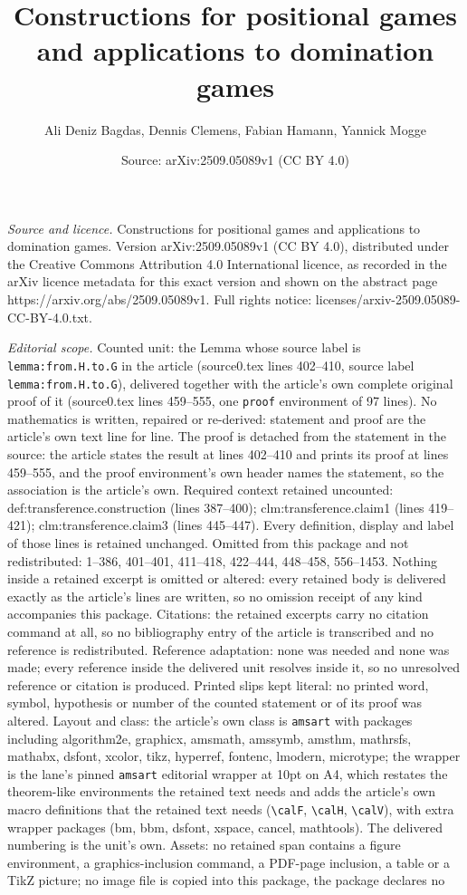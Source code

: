 \documentclass[10pt,a4paper]{amsart}
\title[Constructions for positional games and applications to domin]{Constructions for positional games and applications to domination games}
\author{Ali Deniz Bagdas, Dennis Clemens, Fabian Hamann, Yannick Mogge}
\date{Source: arXiv:2509.05089v1 (CC BY 4.0)}
\begin{document}
\maketitle

\noindent\emph{Source and licence.} Constructions for positional games and applications to domination games. Version arXiv:2509.05089v1 (CC BY 4.0), distributed under the Creative Commons Attribution 4.0 International licence, as recorded in the arXiv licence metadata for this exact version and shown on the abstract page https://arxiv.org/abs/2509.05089v1. Full rights notice: licenses/arxiv-2509.05089-CC-BY-4.0.txt.\par\smallskip

\noindent\textit{Editorial scope.} Counted unit: the Lemma whose source label is \texttt{lemma:from.H.to.G} in the article (source0.tex lines 402--410, source label \texttt{lemma:from.H.to.G}), delivered together with the article's own complete original proof of it (source0.tex lines 459--555, one \texttt{proof} environment of 97 lines). No mathematics is written, repaired or re-derived: statement and proof are the article's own text line for line. The proof is detached from the statement in the source: the article states the result at lines 402--410 and prints its proof at lines 459--555, and the proof environment's own header names the statement, so the association is the article's own. Required context retained uncounted: def:transference.construction (lines 387--400); clm:transference.claim1 (lines 419--421); clm:transference.claim3 (lines 445--447). Every definition, display and label of those lines is retained unchanged. Omitted from this package and not redistributed: 1--386, 401--401, 411--418, 422--444, 448--458, 556--1453. Nothing inside a retained excerpt is omitted or altered: every retained body is delivered exactly as the article's lines are written, so no omission receipt of any kind accompanies this package. Citations: the retained excerpts carry no citation command at all, so no bibliography entry of the article is transcribed and no reference is redistributed. Reference adaptation: none was needed and none was made; every reference inside the delivered unit resolves inside it, so no unresolved reference or citation is produced. Printed slips kept literal: no printed word, symbol, hypothesis or number of the counted statement or of its proof was altered. Layout and class: the article's own class is \texttt{amsart} with packages including algorithm2e, graphicx, amsmath, amssymb, amsthm, mathrsfs, mathabx, dsfont, xcolor, tikz, hyperref, fontenc, lmodern, microtype; the wrapper is the lane's pinned \texttt{amsart} editorial wrapper at 10pt on A4, which restates the theorem-like environments the retained text needs and adds the article's own macro definitions that the retained text needs (\texttt{\textbackslash calF}, \texttt{\textbackslash calH}, \texttt{\textbackslash calV}), with extra wrapper packages (bm, bbm, dsfont, xspace, cancel, mathtools). The delivered numbering is the unit's own. Assets: no retained span contains a figure environment, a graphics-inclusion command, a PDF-page inclusion, a table or a TikZ picture; no image file is copied into this package, the package declares no 
\end{document}
